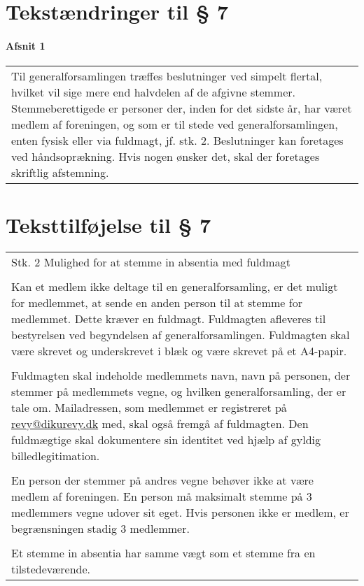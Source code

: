 \documentclass[a4paper,11pt]{report}
\newenvironment{quotationb}%
{\begin{tabular}{|p{10cm}}}%
{\\\end{tabular}}
\begin{document}
\begin{appendices}
\section*{Tekstændringer til § 7}

\paragraph{Afsnit 1}

\begin{quotationb}
Til generalforsamlingen træffes beslutninger ved simpelt flertal, hvilket
vil sige mere end halvdelen af de afgivne stemmer. Stemmeberettigede er
personer der, inden for det sidste år, har været medlem af foreningen, og som er
til stede ved generalforsamlingen, enten fysisk eller via fuldmagt, jf. stk. 2.
Beslutninger kan foretages ved håndsoprækning. Hvis nogen ønsker det, skal der
foretages skriftlig afstemning.
\end{quotationb}

\section*{Teksttilføjelse til § 7}
\begin{quotationb}
Stk. 2 Mulighed for at stemme in absentia med fuldmagt\\
\\
Kan et medlem ikke deltage til en generalforsamling, er det muligt for 
medlemmet, at sende en anden person til at stemme for medlemmet. Dette kræver en
fuldmagt. Fuldmagten afleveres til bestyrelsen ved begyndelsen af
generalforsamlingen. Fuldmagten skal være skrevet og underskrevet i blæk og være
skrevet på et A4-papir.\\
\\
Fuldmagten skal indeholde medlemmets navn, navn på personen, der stemmer på
medlemmets vegne, og hvilken generalforsamling, der er tale om. Mailadressen, 
som medlemmet er registreret på \url{revy@dikurevy.dk} med, skal også fremgå af
fuldmagten. Den fuldmægtige skal dokumentere sin identitet ved hjælp af gyldig
billedlegitimation.\\
\\
En person der stemmer på andres vegne behøver ikke at være medlem af foreningen.
En person må maksimalt stemme på 3 medlemmers vegne udover sit eget.  Hvis
personen ikke er medlem, er begrænsningen stadig 3 medlemmer.\\
\\
Et stemme in absentia har samme vægt som et stemme fra en tilstedeværende.
\end{quotationb}

\end{appendices}
\end{document}

